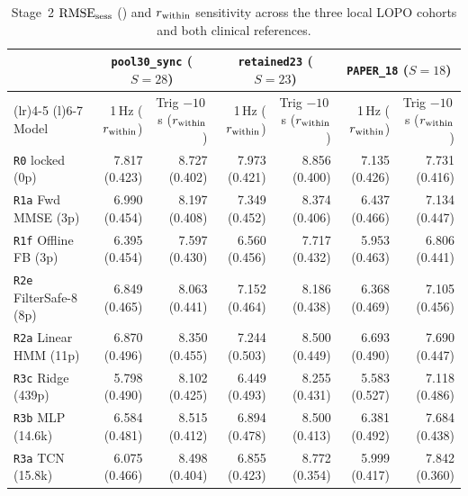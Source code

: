 \begin{table}[htbp]
  \centering
  \scriptsize
  \setlength{\tabcolsep}{4pt}
  \caption{Stage~2 $\mathrm{RMSE}_{\mathrm{sess}}$ (\si{\bpm}) and $r_{\mathrm{within}}$ sensitivity across the three local LOPO
  cohorts and both clinical references.}
  \label{tab:app_cohort_matrix}
  \begin{tabularx}{\textwidth}{@{}>{\raggedright\arraybackslash}X rr rr rr@{}}
    \toprule
    & \multicolumn{2}{c}{\texttt{pool30\_sync} ($S=28$)} & \multicolumn{2}{c}{\texttt{retained23} ($S=23$)} & \multicolumn{2}{c}{\texttt{PAPER\_18} ($S=18$)} \\
    \cmidrule(lr){2-3} \cmidrule(lr){4-5} \cmidrule(l){6-7}
    Model & 1\,Hz ($r_{\mathrm{within}}$) & Trig $-10$\,s ($r_{\mathrm{within}}$) & 1\,Hz ($r_{\mathrm{within}}$) & Trig $-10$\,s ($r_{\mathrm{within}}$) & 1\,Hz ($r_{\mathrm{within}}$) & Trig $-10$\,s ($r_{\mathrm{within}}$) \\
    \midrule
    \texttt{R0} locked (0p) & 7.817 (0.423) & 8.727 (0.402) & 7.973 (0.421) & 8.856 (0.400) & 7.135 (0.426) & 7.731 (0.416) \\
    \texttt{R1a} Fwd MMSE (3p) & 6.990 (0.454) & 8.197 (0.408) & 7.349 (0.452) & 8.374 (0.406) & 6.437 (0.466) & 7.134 (0.447) \\
    \texttt{R1f} Offline FB (3p) & 6.395 (0.454) & 7.597 (0.430) & 6.560 (0.456) & 7.717 (0.432) & 5.953 (0.463) & 6.806 (0.441) \\
    \texttt{R2e} FilterSafe-8 (8p) & 6.849 (0.465) & 8.063 (0.441) & 7.152 (0.464) & 8.186 (0.438) & 6.368 (0.469) & 7.105 (0.456) \\
    \texttt{R2a} Linear HMM (11p) & 6.870 (0.496) & 8.350 (0.455) & 7.244 (0.503) & 8.500 (0.449) & 6.693 (0.490) & 7.690 (0.447) \\
    \texttt{R3c} Ridge (439p) & 5.798 (0.490) & 8.102 (0.425) & 6.449 (0.493) & 8.255 (0.431) & 5.583 (0.527) & 7.118 (0.486) \\
    \texttt{R3b} MLP (14.6k) & 6.584 (0.481) & 8.515 (0.412) & 6.894 (0.478) & 8.500 (0.413) & 6.381 (0.492) & 7.684 (0.438) \\
    \texttt{R3a} TCN (15.8k) & 6.075 (0.466) & 8.498 (0.404) & 6.855 (0.423) & 8.772 (0.354) & 5.999 (0.417) & 7.842 (0.360) \\
    \bottomrule
  \end{tabularx}
\end{table}
